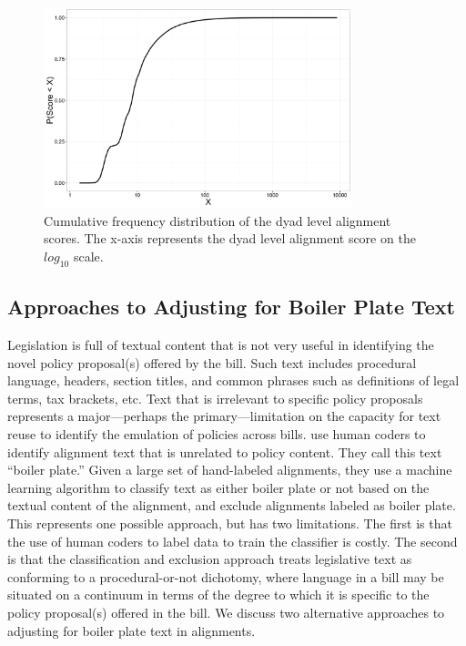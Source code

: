 \documentclass[12pt]{article} %
\begin{document}
\begin{figure}[ht!]
    \centering
    \includegraphics[width=0.8\textwidth]{figures/alignment_score_distribution.png}
    \caption{Cumulative frequency distribution of the dyad level alignment
    scores. The x-axis represents the dyad level alignment score on the
    $log_{10}$ scale.}
    \label{fig:alignment_score_distribution}
\end{figure}



\subsection{Approaches to Adjusting for Boiler Plate Text}

Legislation is full of textual content that is not very useful in identifying the novel policy proposal(s) offered by the bill. Such text includes procedural language, headers, section titles, and common phrases such as definitions of legal terms, tax brackets, etc. Text that is irrelevant to specific policy proposals represents a major---perhaps the primary---limitation on the capacity for text reuse to identify the emulation of policies across bills. \citet{wilkerson2015tracing} use human coders to identify alignment text that is unrelated to policy content. They call this text ``boiler plate.'' Given a large set of hand-labeled alignments, they use a machine learning algorithm to classify text as either boiler plate or not based on the textual content of the alignment, and exclude alignments labeled as boiler plate. This represents one possible approach, but has two limitations. The first is that the use of human coders to label data to train the classifier is costly. The second is that the classification and exclusion approach treats legislative text as conforming to a procedural-or-not dichotomy, where language in a bill may be situated on a continuum in terms of the degree to which it is specific to the policy proposal(s) offered in the bill. We discuss two alternative approaches to adjusting for boiler plate text in alignments.
\end{document}
